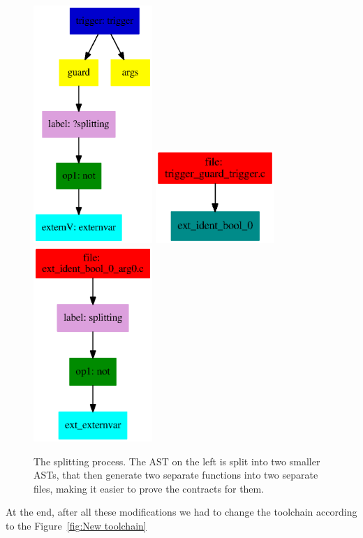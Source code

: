 \documentclass[a4paper,11pt,final]{article}
\begin{document}
	\begin{figure}
		\includegraphics[width=45mm]{images/label/main.ps}
		\centering
		\includegraphics[width=45mm]{images/label/splitted.ps}
		\includegraphics[width=45mm]{images/label/splitted2.ps}
		\caption{The splitting process. The AST on the left is split into two smaller ASTs, that then generate two separate functions into two separate files, making it easier to prove the contracts for them.}
		\label{fig:splitting label}
	\end{figure}
	
	At the end, after all these modifications we had to change the toolchain according to the Figure~\ref{fig:New toolchain}
	
\end{document}
